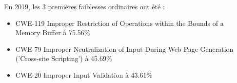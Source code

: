 En 2019, les 3 premières faiblesses ordinaires ont été : 

\begin{itemize}
  \item CWE-119	Improper Restriction of Operations within the Bounds of a Memory Buffer	à 75.56\%
  \item CWE-79	Improper Neutralization of Input During Web Page Generation ('Cross-site Scripting')	à 45.69\%
  \item CWE-20	Improper Input Validation à 43.61\%
\end{itemize}




